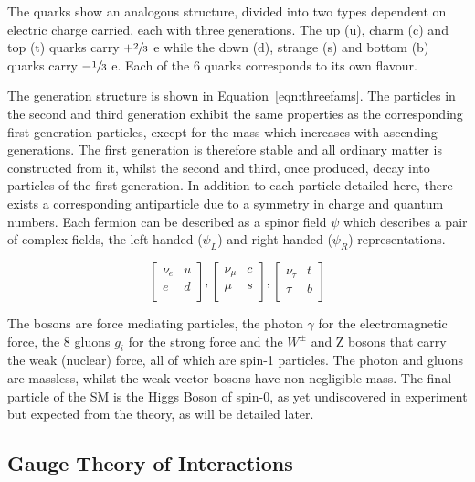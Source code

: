 The quarks show an analogous structure, divided into two types dependent on electric charge carried, each with three generations. The up (u), charm (c) and top (t) quarks carry $+\sfrac{2}{3}$ e while the down (d), strange (s) and bottom (b) quarks carry $-\sfrac{1}{3}$ e. Each of the 6 quarks corresponds to its own flavour. 

The generation structure is shown in Equation~\ref{eqn:threefams}. The particles in the second and third generation exhibit the same properties as the corresponding first generation particles, except for the mass which increases with ascending generations. The first generation is therefore stable and all ordinary matter is constructed from it, whilst the second and third, once produced, decay into particles of the first generation. In addition to each particle detailed here, there exists a corresponding antiparticle due to a symmetry in charge and quantum numbers.  Each fermion can be described as a spinor field $\psi$ which describes a pair of complex fields, the left-handed ($\psi_{L}$) and right-handed ($\psi_{R}$) representations. 
 
\begin{equation}
\begin{bmatrix}
\nu_{e} & u \\
e & d \\
\end{bmatrix},
\begin{bmatrix}
\nu_{\mu} & c \\
\mu & s \\
\end{bmatrix},
\begin{bmatrix}
\nu_{\tau} & t \\
\tau & b\\
\end{bmatrix}
\label{eqn:threefams}
\end{equation}

The bosons are force mediating particles, the photon $\gamma$ for the electromagnetic force, the 8 gluons $g_{i}$ for the strong force and the $W^{\pm}$ and Z bosons that carry the weak (nuclear) force, all of which are spin-1 particles. The photon and gluons are massless, whilst the weak vector bosons have non-negligible mass. The final particle of the SM is the Higgs Boson of spin-0, as yet undiscovered in experiment but expected from the theory, as will be detailed later. 

\subsection{Gauge Theory of Interactions}

